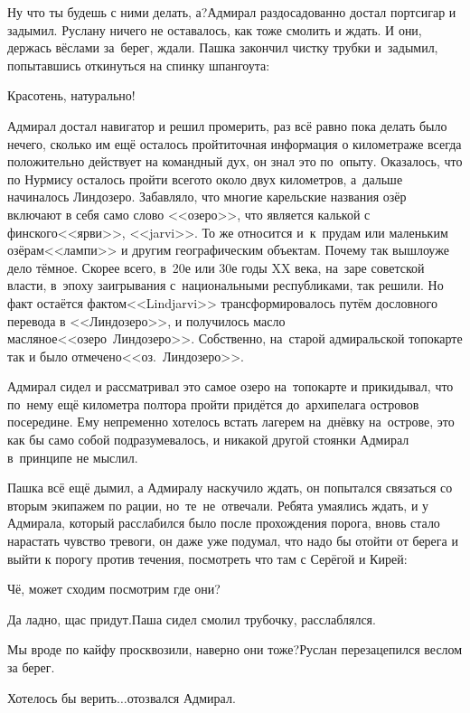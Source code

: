 \diagdash Ну что ты будешь с ними делать, а?\mdash Адмирал раздосадованно достал портсигар и задымил. Руслану ничего не оставалось, как тоже смолить и ждать. И они, держась вёслами за~берег, ждали. Пашка закончил чистку трубки и~задымил, попытавшись откинуться на спинку шпангоута:

\diagdash Красотень, натурально!

Адмирал достал навигатор и решил промерить, раз всё равно пока делать было нечего, сколько им ещё осталось пройти\mdash точная информация о километраже всегда положительно действует на командный дух, он знал это по~опыту. Оказалось, что по Нурмису осталось пройти всего\sdash то около двух километров, а~дальше начиналось Линдозеро. Забавляло, что многие карельские названия озёр включают в себя само слово <<озеро>>, что является калькой с финского\mdash <<ярви>>, <<jarvi>>. То же относится и~к~прудам или маленьким озёрам\mdash <<лампи>> и другим географическим объектам. Почему так вышло\mdash уже дело тёмное. Скорее всего, в~20\sdash е или 30\sdash е годы XX века, на~заре советской власти, в~эпоху заигрывания с~национальными республиками, так решили. Но факт остаётся фактом\mdash <<Lindjarvi>> трансформировалось путём дословного перевода в <<Линдозеро>>, и получилось масло масляное\mdash <<озеро~Линдозеро>>. Собственно, на~старой адмиральской топокарте так и было отмечено\mdash <<оз.~Линдозеро>>. 

Адмирал сидел и рассматривал это самое озеро на~топокарте и прикидывал, что по~нему ещё километра полтора пройти придётся до~архипелага островов посередине. Ему непременно хотелось встать лагерем на~днёвку на~острове, это как бы само собой подразумевалось, и никакой другой стоянки Адмирал в~принципе не мыслил.

Пашка всё ещё дымил, а Адмиралу наскучило ждать, он попытался связаться со вторым экипажем по рации, но~те~не~отвечали. Ребята умаялись ждать, и у Адмирала, который расслабился было после прохождения порога, вновь стало нарастать чувство тревоги, он даже уже подумал, что надо бы отойти от берега и выйти к порогу против течения, посмотреть что там с Серёгой и Кирей:

\diagdash Чё, может сходим посмотрим где они?

\diagdash Да ладно, щас придут.\mdash Паша сидел смолил трубочку, расслаблялся.

\diagdash Мы вроде по кайфу просквозили, наверно они тоже?\mdash Руслан перезацепился веслом за берег.

\diagdash Хотелось бы верить$\ldots$\mdash отозвался Адмирал.

